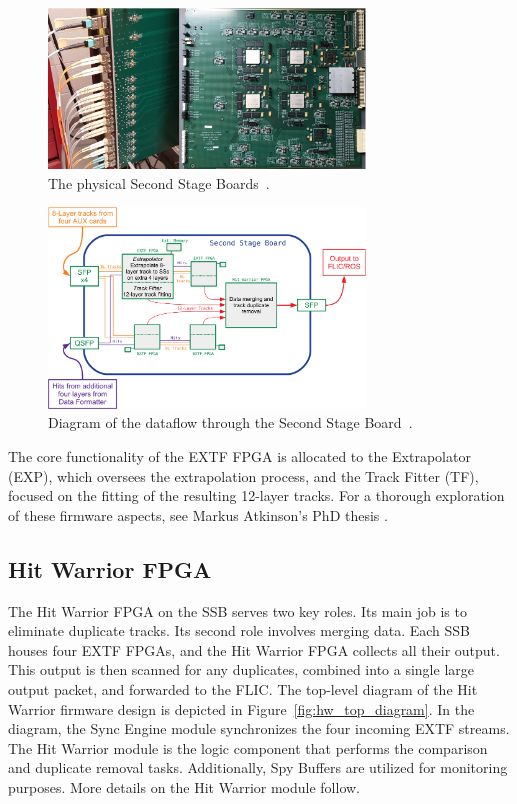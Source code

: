 \begin{figure}[ht]
  \centering
  \includegraphics[width=0.75\textwidth]{figures/ftk/ssb_board.pdf}
  \caption{The physical Second Stage Boards~\cite{Aad_2021}.}
  \label{fig:ssb_board}
\end{figure}

\begin{figure}[ht]
  \centering
  \includegraphics[width=0.75\textwidth]{figures/ftk/ssb_diagram.pdf}
  \caption{Diagram of the dataflow through the Second Stage Board~\cite{Aad_2021}.}
  \label{fig:ssb_diagram}
\end{figure}

The core functionality of the EXTF FPGA is allocated to the Extrapolator (EXP), which oversees the extrapolation process, and the Track Fitter (TF), focused on the fitting of the resulting 12-layer tracks. For a thorough exploration of these firmware aspects, see Markus Atkinson's PhD thesis \cite{Atkinson2019}.

\subsection{Hit Warrior FPGA}
The Hit Warrior FPGA on the SSB serves two key roles. Its main job is to eliminate duplicate tracks. Its second role involves merging data. Each SSB houses four EXTF FPGAs, and the Hit Warrior FPGA collects all their output. This output is then scanned for any duplicates, combined into a single large output packet, and forwarded to the FLIC.
The top-level diagram of the Hit Warrior firmware design is depicted in Figure~\ref{fig:hw_top_diagram}. In the diagram, the Sync Engine module synchronizes the four incoming EXTF streams. The Hit Warrior module is the logic component that performs the comparison and duplicate removal tasks. Additionally, Spy Buffers are utilized for monitoring purposes. More details on the Hit Warrior module follow.

